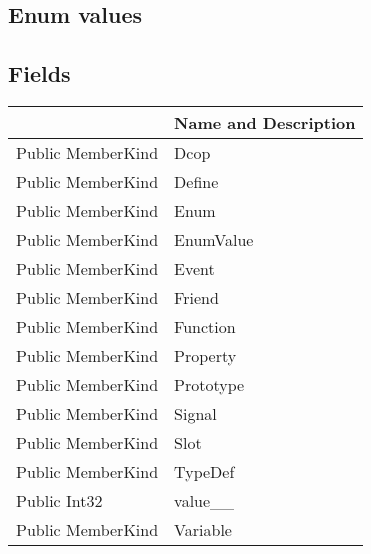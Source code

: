 \documentclass[11pt, oneside, a4paper]{book}
\begin{document}
\subsection{Enum values}

\subsection{Fields}
\begin{center}
\begin{tabular}{| p{3cm} | p{12cm} | }
\hline
\textbf{ } & \textbf{ Name and Description}\\
\hline
 Public  MemberKind &  Dcop\hypertarget{SoftwareEngineeringTools.{}Documentation.{}MemberKind.{}Dcop}{}\\
\hline
 Public  MemberKind &  Define\hypertarget{SoftwareEngineeringTools.{}Documentation.{}MemberKind.{}Define}{}\\
\hline
 Public  MemberKind &  Enum\hypertarget{SoftwareEngineeringTools.{}Documentation.{}MemberKind.{}Enum}{}\\
\hline
 Public  MemberKind &  EnumValue\hypertarget{SoftwareEngineeringTools.{}Documentation.{}MemberKind.{}EnumValue}{}\\
\hline
 Public  MemberKind &  Event\hypertarget{SoftwareEngineeringTools.{}Documentation.{}MemberKind.{}Event}{}\\
\hline
 Public  MemberKind &  Friend\hypertarget{SoftwareEngineeringTools.{}Documentation.{}MemberKind.{}Friend}{}\\
\hline
 Public  MemberKind &  Function\hypertarget{SoftwareEngineeringTools.{}Documentation.{}MemberKind.{}Function}{}\\
\hline
 Public  MemberKind &  Property\hypertarget{SoftwareEngineeringTools.{}Documentation.{}MemberKind.{}Property}{}\\
\hline
 Public  MemberKind &  Prototype\hypertarget{SoftwareEngineeringTools.{}Documentation.{}MemberKind.{}Prototype}{}\\
\hline
 Public  MemberKind &  Signal\hypertarget{SoftwareEngineeringTools.{}Documentation.{}MemberKind.{}Signal}{}\\
\hline
 Public  MemberKind &  Slot\hypertarget{SoftwareEngineeringTools.{}Documentation.{}MemberKind.{}Slot}{}\\
\hline
 Public  MemberKind &  TypeDef\hypertarget{SoftwareEngineeringTools.{}Documentation.{}MemberKind.{}TypeDef}{}\\
\hline
 Public  Int32 &  value\_\_\hypertarget{SoftwareEngineeringTools.{}Documentation.{}MemberKind.{}value\_\_}{}\\
\hline
 Public  MemberKind &  Variable\hypertarget{SoftwareEngineeringTools.{}Documentation.{}MemberKind.{}Variable}{}\\
\hline
\end{tabular}
\end{center}
\end{document}
